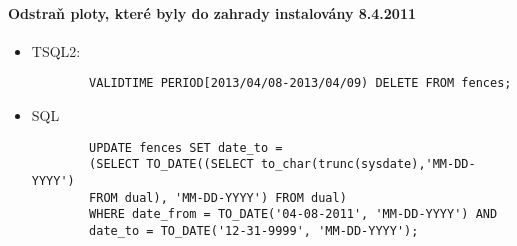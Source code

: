\documentclass[12pt,a4paper]{article}
\begin{document}
\paragraph*{Odstraň ploty, které byly do zahrady instalovány 8.4.2011}
\begin{itemize}

	\item
	TSQL2:
		\begin{verbatim}
		VALIDTIME PERIOD[2013/04/08-2013/04/09) DELETE FROM fences;
		\end{verbatim}
	\item
	SQL
		\begin{verbatim}
		UPDATE fences SET date_to = 
		(SELECT TO_DATE((SELECT to_char(trunc(sysdate),'MM-DD-YYYY') 
		FROM dual), 'MM-DD-YYYY') FROM dual)
		WHERE date_from = TO_DATE('04-08-2011', 'MM-DD-YYYY') AND
		date_to = TO_DATE('12-31-9999', 'MM-DD-YYYY');
		\end{verbatim}

\end{itemize}
\end{document}

